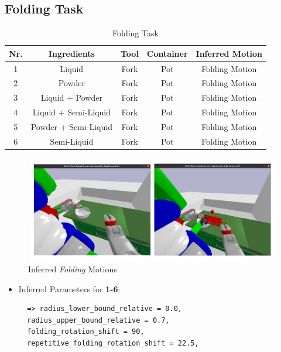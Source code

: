 \subsection*{Folding Task}
\begin{table}[H]
  \centering
  \begin{tabular}{|c|c|c|c|c|}
    \hline
    \textbf{Nr.} & \textbf{Ingredients} & \textbf{Tool} & \textbf{Container} & \textbf{Inferred Motion}  \\
    \hline
    1 & Liquid & Fork & Pot & Folding Motion \\
    \hline
    2 & Powder & Fork & Pot & Folding Motion \\
    \hline
    3 & Liquid + Powder & Fork & Pot & Folding Motion \\
    \hline
    4 & Liquid + Semi-Liquid & Fork & Pot & Folding Motion \\
    \hline
    5 & Powder + Semi-Liquid & Fork & Pot & Folding Motion \\
    \hline
    6 & Semi-Liquid & Fork & Pot & Folding Motion \\
    \hline
  \end{tabular}
  \caption{Folding Task}
  \label{tab:mixingtask}
\end{table}

\begin{figure}[H]
  \centering
  \includegraphics[scale=0.25]{Graphics/folding_evaluation.jpg}
  \caption{Inferred \textit{Folding} Motions}
  \label{fig:mixingverb WikiHow}
\end{figure}

\begin{itemize}
\item Inferred Parameters for \textbf{1-6}: 
 \begin{lstlisting}
  => radius_lower_bound_relative = 0.0, 
  radius_upper_bound_relative = 0.7,
  folding_rotation_shift = 90, 
  repetitive_folding_rotation_shift = 22.5,
\end{lstlisting}
\end{itemize}